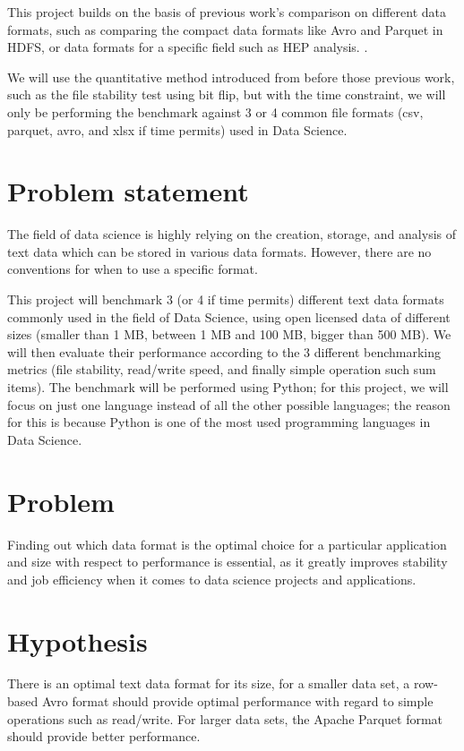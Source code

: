 \documentclass[12pt,twoside,english]{article}
\begin{document}
This project builds on the basis of previous work's comparison on different data formats, such as comparing the compact data formats like Avro and Parquet in HDFS, or data formats for a specific field such as \gls{HEP} analysis. \cite{plase_comparison_2017, blomer_quantitative_2018}.

We will use the quantitative method introduced from before those previous work, such as the file stability test using bit flip, but with the time constraint, we will only be performing the benchmark against 3 or 4 common file formats (csv, parquet, avro, and xlsx if time permits) used in Data Science.

\section{Problem statement}
\label{sect:problem_statement}
The field of data science is highly relying on the creation, storage, and analysis of text data which can be stored in various data formats. However, there are no conventions for when to use a specific format. %

This project will benchmark 3 (or 4 if time permits) different text data formats commonly used in the field of Data Science, using open licensed data of different sizes (smaller than 1 MB, between 1 MB and 100 MB, bigger than 500 MB). We will then evaluate their performance according to the 3 different benchmarking metrics (file stability, read/write speed, and finally simple operation such sum items). The benchmark will be performed using Python; for this project, we will focus on just one language instead of all the other possible languages; the reason for this is because Python is one of the most used programming languages in Data Science.

\section{Problem}
\label{sect:problem}
Finding out which data format is the optimal choice for a particular application and size with respect to performance is essential, as it greatly improves stability and job efficiency when it comes to data science projects and applications. 

\section{Hypothesis}
\label{sect:hypothesis}
There is an optimal text data format for its size, for a smaller data set, a row-based Avro format should provide optimal performance with regard to simple operations such as read/write. For larger data sets, the Apache Parquet format should provide better performance.
\end{document}
